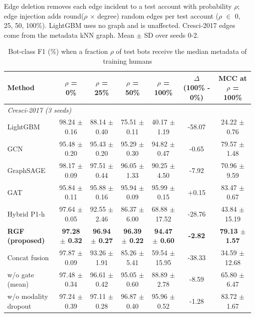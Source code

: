 \begin{table}[!t]
\begin{tabular}{lccccccc}
\hline
\end{tabular}
\par\smallskip\parbox{\linewidth}{\scriptsize Edge deletion removes each edge incident to a test account with probability $\rho$; edge injection adds round($\rho$ $\times$ degree) random edges per test account ($\rho$ $\in$ {0, 25, 50, 100}\%). LightGBM uses no graph and is unaffected. Cresci-2017 edges come from the metadata kNN graph. Mean $\pm$ SD over seeds 0-2.}
\end{table}

\begin{table}[!t]
\centering
\caption{Bot-class F1 (\%) when a fraction $\rho$ of test bots receive the median metadata of training humans}
\label{tab:metadata_mimicry}
\scriptsize
\setlength{\tabcolsep}{3pt}
\begin{tabular}{lcccccc}
\hline
\textbf{Method} & \textbf{$\rho$ = 0\%} & \textbf{$\rho$ = 25\%} & \textbf{$\rho$ = 50\%} & \textbf{$\rho$ = 100\%} & \textbf{$\Delta$ (100\% - 0\%)} & \textbf{MCC at $\rho$ = 100\%} \\
\hline
\multicolumn{7}{l}{\textit{Cresci-2017 (3 seeds)}} \\
LightGBM & 98.24 $\pm$ 0.16 & 88.14 $\pm$ 0.40 & 75.51 $\pm$ 0.11 & 40.17 $\pm$ 1.19 & -58.07 & 24.22 $\pm$ 0.76 \\
GCN & 95.48 $\pm$ 0.20 & 95.43 $\pm$ 0.20 & 95.29 $\pm$ 0.30 & 94.82 $\pm$ 0.47 & -0.65 & 79.57 $\pm$ 1.48 \\
GraphSAGE & 98.17 $\pm$ 0.09 & 97.51 $\pm$ 0.44 & 96.05 $\pm$ 1.33 & 90.25 $\pm$ 4.50 & -7.92 & 70.96 $\pm$ 9.59 \\
GAT & 95.84 $\pm$ 0.11 & 95.88 $\pm$ 0.16 & 95.94 $\pm$ 0.09 & 95.99 $\pm$ 0.15 & +0.15 & 83.47 $\pm$ 0.67 \\
Hybrid P1-h & 97.64 $\pm$ 0.05 & 92.55 $\pm$ 2.46 & 86.37 $\pm$ 6.00 & 68.88 $\pm$ 17.52 & -28.76 & 43.84 $\pm$ 15.19 \\
\textbf{RGF (proposed)} & \textbf{97.28 $\pm$ 0.32} & \textbf{96.94 $\pm$ 0.27} & \textbf{96.39 $\pm$ 0.22} & \textbf{94.47 $\pm$ 0.60} & \textbf{-2.82} & \textbf{79.13 $\pm$ 1.57} \\
Concat fusion & 97.87 $\pm$ 0.09 & 93.26 $\pm$ 1.91 & 85.26 $\pm$ 5.41 & 59.54 $\pm$ 15.95 & -38.33 & 34.59 $\pm$ 12.68 \\
w/o gate (mean) & 97.48 $\pm$ 0.34 & 96.61 $\pm$ 0.42 & 95.05 $\pm$ 0.60 & 88.89 $\pm$ 2.78 & -8.59 & 65.80 $\pm$ 6.47 \\
w/o modality dropout & 97.24 $\pm$ 0.39 & 97.11 $\pm$ 0.28 & 96.87 $\pm$ 0.40 & 95.96 $\pm$ 0.52 & -1.28 & 83.72 $\pm$ 1.67 \\

\end{tabular}
\end{table}
